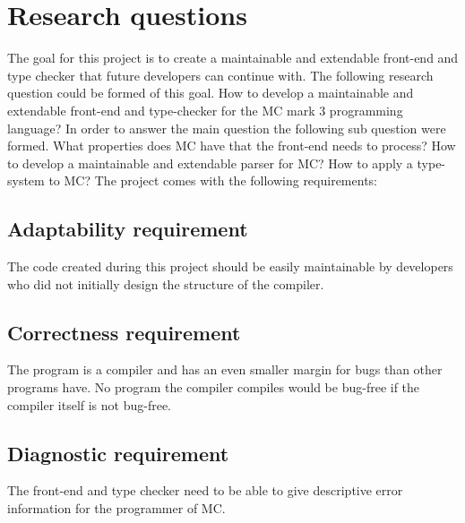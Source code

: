 \section{Research questions}

The goal for this project is to create a maintainable and extendable front-end and type checker that future developers can continue with. The following research question could be formed of this goal. 
	How to develop a maintainable and extendable front-end and type-checker for the MC mark 3 programming language?
In order to answer the main question the following sub question were formed.
	What properties does MC have that the front-end needs to process?
	How to develop a maintainable and extendable parser for MC?
	How to apply a type-system to MC?
The project comes with the following requirements:

\subsection{Adaptability requirement}
The code created during this project should be easily maintainable by developers who did not initially design the structure of the compiler.

\subsection{Correctness requirement}
The program is a compiler and has an even smaller margin for bugs than other programs have. 
No program the compiler compiles would be bug-free if the compiler itself is not bug-free.

\subsection{Diagnostic requirement}
The front-end and type checker need to be able to give descriptive error information for the programmer of MC.
